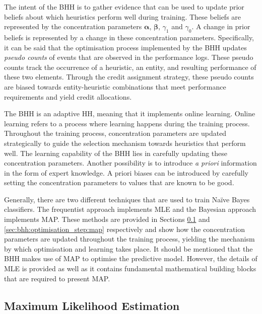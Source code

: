 The intent of the \acs{BHH} is to gather evidence that can be used to update prior beliefs about which heuristics perform well during training. These beliefs are represented by the concentration parameters $\boldsymbol{\alpha}$, $\boldsymbol{\beta}$, $\gamma_{1}$ and $\gamma_{0}$. A change in prior beliefs is represented by a change in these concentration parameters. Specifically, it can be said that the optimisation process implemented by the \acs{BHH} updates \textit{pseudo counts} of events that are observed in the performance logs. These pseudo counts track the occurrence of a heuristic, an entity, and resulting performance of these two elements. Through the credit assignment strategy, these pseudo counts are biased towards entity-heuristic combinations that meet performance requirements and yield credit allocations.

The \acs{BHH} is an adaptive \ac{HH}, meaning that it implements online learning. Online learning refers to a process where learning happens during the training process. Throughout the training process, concentration parameters are updated strategically to guide the selection mechanism towards heuristics that perform well. The learning capability of the \acs{BHH} lies in carefully updating these concentration parameters. Another possibility is to introduce \textit{a priori} information in the form of expert knowledge. A priori biases can be introduced by carefully setting the concentration parameters to values that are known to be good.

Generally, there are two different techniques that are used to train Naïve Bayes classifiers. The frequentist approach implements \acf{MLE} and the Bayesian approach implements \acf{MAP}. These methods are provided in Sections \ref{sec:bhh:optimisation_step:mle} and \ref{sec:bhh:optimisation_step:map} respectively and show how the concentration parameters are updated throughout the training process, yielding the mechanism by which optimisation and learning takes place. It should be mentioned that the \acs{BHH} makes use of \acs{MAP} to optimise the predictive model. However, the details of \acs{MLE} is provided as well as it contains fundamental mathematical building blocks that are required to present \acs{MAP}.


\subsection{Maximum Likelihood Estimation}\label{sec:bhh:optimisation_step:mle}

